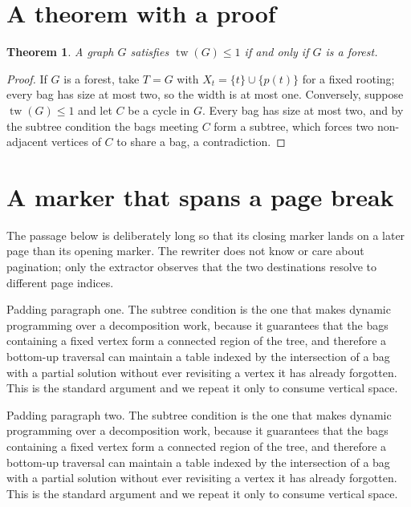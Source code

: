 \documentclass{article}
\newtheorem{theorem}{Theorem}
\theoremstyle{definition}
\begin{document}
\section{A theorem with a proof}

\begin{theorem}
  \label{thm:forest}
  A graph $G$ satisfies $\operatorname{tw}(G) \le 1$ if and only if $G$ is
  a forest.
\end{theorem}

\begin{proof}
  If $G$ is a forest, take $T = G$ with $X_t = \{t\} \cup \{p(t)\}$ for a
  fixed rooting; every bag has size at most two, so the width is at most
  one.  Conversely, suppose $\operatorname{tw}(G) \le 1$ and let $C$ be a
  cycle in $G$.  Every bag has size at most two, and by the subtree
  condition the bags meeting $C$ form a subtree, which forces two
  non-adjacent vertices of $C$ to share a bag, a contradiction.
\end{proof}


\section{A marker that spans a page break}

The passage below is deliberately long so that its closing marker lands on
a later page than its opening marker.  The rewriter does not know or care
about pagination; only the extractor observes that the two destinations
resolve to different page indices.

Padding paragraph one.  The subtree condition is the one that makes dynamic
programming over a decomposition work, because it guarantees that the bags
containing a fixed vertex form a connected region of the tree, and therefore
a bottom-up traversal can maintain a table indexed by the intersection of a
bag with a partial solution without ever revisiting a vertex it has already
forgotten.  This is the standard argument and we repeat it only to consume
vertical space.

Padding paragraph two.  The subtree condition is the one that makes dynamic
programming over a decomposition work, because it guarantees that the bags
containing a fixed vertex form a connected region of the tree, and therefore
a bottom-up traversal can maintain a table indexed by the intersection of a
bag with a partial solution without ever revisiting a vertex it has already
forgotten.  This is the standard argument and we repeat it only to consume
vertical space.
\end{document}
